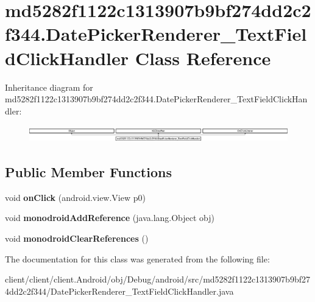\hypertarget{classmd5282f1122c1313907b9bf274dd2c2f344_1_1DatePickerRenderer__TextFieldClickHandler}{}\section{md5282f1122c1313907b9bf274dd2c2f344.\+Date\+Picker\+Renderer\+\_\+\+Text\+Field\+Click\+Handler Class Reference}
\label{classmd5282f1122c1313907b9bf274dd2c2f344_1_1DatePickerRenderer__TextFieldClickHandler}
Inheritance diagram for md5282f1122c1313907b9bf274dd2c2f344.\+Date\+Picker\+Renderer\+\_\+\+Text\+Field\+Click\+Handler\+:\begin{figure}[H]
\begin{center}
\leavevmode
\includegraphics[height=0.734908cm]{classmd5282f1122c1313907b9bf274dd2c2f344_1_1DatePickerRenderer__TextFieldClickHandler}
\end{center}
\end{figure}
\subsection*{Public Member Functions}
\begin{DoxyCompactItemize}
\item 
\hypertarget{classmd5282f1122c1313907b9bf274dd2c2f344_1_1DatePickerRenderer__TextFieldClickHandler_a17117f60faf2ab1e2e82249eab15bc31}{}void {\bfseries on\+Click} (android.\+view.\+View p0)\label{classmd5282f1122c1313907b9bf274dd2c2f344_1_1DatePickerRenderer__TextFieldClickHandler_a17117f60faf2ab1e2e82249eab15bc31}

\item 
\hypertarget{classmd5282f1122c1313907b9bf274dd2c2f344_1_1DatePickerRenderer__TextFieldClickHandler_a8705fb6e462d99da2f98ac4c8e864e1b}{}void {\bfseries monodroid\+Add\+Reference} (java.\+lang.\+Object obj)\label{classmd5282f1122c1313907b9bf274dd2c2f344_1_1DatePickerRenderer__TextFieldClickHandler_a8705fb6e462d99da2f98ac4c8e864e1b}

\item 
\hypertarget{classmd5282f1122c1313907b9bf274dd2c2f344_1_1DatePickerRenderer__TextFieldClickHandler_a271f216400e926f3cfe9877a745f30aa}{}void {\bfseries monodroid\+Clear\+References} ()\label{classmd5282f1122c1313907b9bf274dd2c2f344_1_1DatePickerRenderer__TextFieldClickHandler_a271f216400e926f3cfe9877a745f30aa}

\end{DoxyCompactItemize}


The documentation for this class was generated from the following file\+:\begin{DoxyCompactItemize}
\item 
client/client/client.\+Android/obj/\+Debug/android/src/md5282f1122c1313907b9bf274dd2c2f344/Date\+Picker\+Renderer\+\_\+\+Text\+Field\+Click\+Handler.\+java\end{DoxyCompactItemize}
